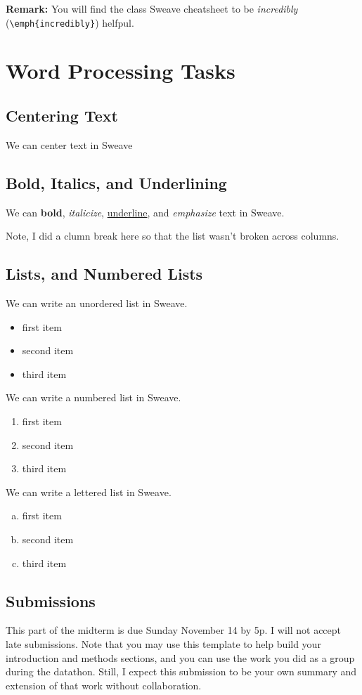 \documentclass{article}\usepackage[]{graphicx}\usepackage[]{xcolor}
\begin{document}
\begin{multicols}{2}
\noindent \textbf{Remark:} You will find the class Sweave cheatsheet to be \emph{incredibly} (\verb|\emph{incredibly}|) helfpul.



\section{Word Processing Tasks}
\subsection{Centering Text}
\begin{center}
We can center text in Sweave
\end{center}


\subsection{Bold, Italics, and Underlining}
We can \textbf{bold}, \textit{italicize},
\underline{underline}, and \emph{emphasize} text in Sweave.

Note, I did a clumn break here so that the list wasn't broken across columns. \columnbreak
 
  
\subsection{Lists, and Numbered Lists}
We can write an unordered list in Sweave.
\begin{itemize}\itemsep0em
\item first item
\item second item
\item third item
\end{itemize}
We can write a numbered list in Sweave.
\begin{enumerate}[1.]\itemsep0em
\item first item
\item second item
\item third item
\end{enumerate}
We can write a lettered list in Sweave.
\begin{enumerate}[a.]\itemsep0em
\item first item
\item second item
\item third item
\end{enumerate}


\subsection{Submissions}
This part of the midterm is due Sunday November 14 by 5p. I will not accept late submissions. Note that you may use this template to help build your introduction and methods sections, and you can use the work you did as a group during the datathon. Still, I expect this submission to be your own summary and extension of that work without collaboration.



\end{multicols}
\end{document}
